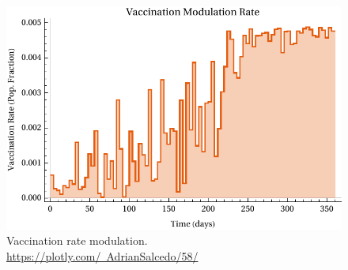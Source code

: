 \begin{figure}
    \centering
    \includegraphics[width=0.7\linewidth]{figs/Vaccination_control_signal}
    \caption[Vaccination rate modulation.]{Vaccination rate modulation.
    \href{https://plotly.com/~AdrianSalcedo/58/}
    {https://plotly.com/~AdrianSalcedo/58/}}
    \label{fig:vaccinationcontrolsignal}
\end{figure}

